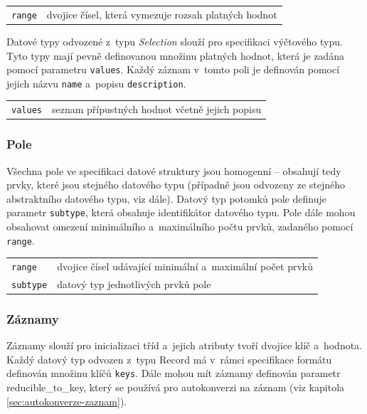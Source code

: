 \documentclass[FM,bw,DP]{tulthesis}
\begin{document}
\vspace{0.5cm}
\begin{tabular}{m{3cm}@{}l}
\texttt{range}\dotfill & dvojice čísel, která vymezuje rozsah platných hodnot \\
\end{tabular}
\vspace{0.5cm}

Datové typy odvozené z~typu \textit{Selection} slouží pro specifikaci výčtového typu. Tyto typy mají pevně definovanou množinu platných hodnot, která je zadána pomocí parametru \texttt{values}. Každý záznam v~tomto poli je definován pomocí jejich názvu \texttt{name} a~popisu \texttt{description}.


\vspace{0.5cm}
\begin{tabular}{m{3cm}@{}l}
\texttt{values}\dotfill & seznam přípustných hodnot včetně jejich popisu \\
\end{tabular}

\subsubsection{Pole}

Všechna pole ve specifikaci datové struktury jsou homogenní -- obsahují tedy prvky, které jsou stejného datového typu (případně jsou odvozeny ze stejného abstraktního datového typu, viz dále). Datový typ potomků pole definuje parametr \texttt{subtype}, která obsahuje identifikátor datového typu. Pole dále mohou obsahovat omezení minimálního a~maximálního počtu prvků, zadaného pomocí \texttt{range}.

\vspace{0.5cm}
\begin{tabular}{m{3cm}@{}l}
\texttt{range}\dotfill & dvojice čísel udávající minimální a~maximální počet prvků \\
\texttt{subtype}\dotfill & datový typ jednotlivých prvků pole \\
\end{tabular}
\vspace{0.5cm}

\subsubsection{Záznamy}

Záznamy slouží pro inicializaci tříd a~jejich atributy tvoří dvojice klíč a~hodnota. Každý datový typ odvozen z~typu Record má v~rámci specifikace formátu definován množinu klíčů \texttt{keys}. Dále mohou mít záznamy definován parametr reducible\_to\_key, který se používá pro autokonverzi na záznam (viz kapitola \ref{sec:autokonverze-zaznam}).
\end{document}
